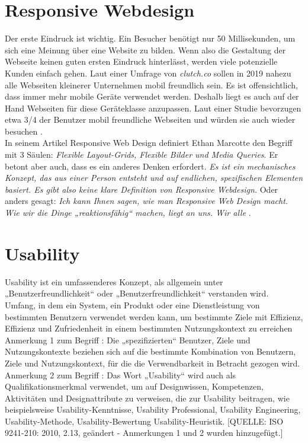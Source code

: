 \section{Responsive Webdesign}
\label{sec:responsive}
%
Der erste Eindruck ist wichtig. Ein Besucher benötigt nur 50 Millisekunden, um sich eine Meinung über eine Website zu bilden. Wenn also die Gestaltung der Webseite keinen guten ersten Eindruck hinterlässt, werden viele potenzielle Kunden einfach gehen\cite{webalive}. Laut einer Umfrage von \textit{clutch.co} sollen in 2019 nahezu alle Webseiten kleinerer Unternehmen mobil freundlich sein. Es ist offensichtlich, dass immer mehr mobile Geräte verwendet werden. Deshalb liegt es auch auf der Hand Webseiten für diese Geräteklasse anzupassen.
Laut einer Studie bevorzugen etwa 3/4 der Benutzer mobil freundliche Webseiten und würden sie auch wieder besuchen \cite{searchenginewatch}.\\
In seinem Artikel Responsive Web Design definiert Ethan Marcotte den Begriff mit 3 Säulen:\textit{ Flexible Layout-Grids, Flexible Bilder und Media Queries}. Er betont aber auch, dass es ein anderes Denken erfordert. \textit{Es ist ein mechanisches Konzept, das aus einer Person entsteht und auf endlichen, spezifischen Elementen basiert. Es gibt also keine klare Definition von Responsive Webdesign.} Oder anders gesagt: \textit{Ich kann Ihnen sagen, wie man Responsive Web Design macht. Wie wir die Dinge „reaktionsfähig“ machen, liegt an uns. Wir alle} \cite{responsive}.
%
%
%
%
%
\section{Usability}
\label{sec:usability}
%
Usability ist ein umfassenderes Konzept, als allgemein unter „Benutzerfreundlichkeit“ oder „Benutzerfreundlichkeit“ verstanden wird. \\
Umfang, in dem ein System, ein Produkt oder eine Dienstleistung von bestimmten Benutzern verwendet werden kann, um bestimmte Ziele mit Effizienz, Effizienz und Zufriedenheit in einem bestimmten Nutzungskontext zu erreichen
Anmerkung 1 zum Begriff : Die „spezifizierten“ Benutzer, Ziele und Nutzungskontexte beziehen sich auf die bestimmte Kombination von Benutzern, Ziele und Nutzungskontext, für die die Verwendbarkeit in Betracht gezogen wird.
Anmerkung 2 zum Begriff : Das Wort „Usability“ wird auch als Qualifikationsmerkmal verwendet, um auf Designwissen, Kompetenzen, Aktivitäten und Designattribute zu verweisen, die zur Usability beitragen, wie beispielsweise Usability-Kenntnisse, Usability Professional, Usability Engineering, Usability-Methode, Usability-Bewertung Usability-Heuristik.
[QUELLE: ISO 9241-210: 2010, 2.13, geändert - Anmerkungen 1 und 2 wurden hinzugefügt.]
%
%
%
%
%
